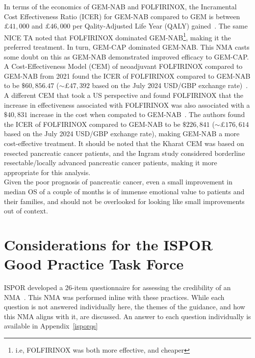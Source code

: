 In terms of the economics of GEM-NAB and FOLFIRINOX, the Incramental Cost Effectiveness Ratio (ICER) for GEM-NAB compared to GEM is between $£41,000$ and $£46,000$ per Qality-Adjusted Life Year (QALY) gained~\cite{TA476}. The same NICE TA noted that FOLFIRINOX dominated GEM-NAB\footnote{i.e, FOLFIRINOX was both more effective, and cheaper}, making it the preferred treatment. In turn, GEM-CAP dominated GEM-NAB. This NMA casts some doubt on this as GEM-NAB demonstrated improved efficacy to GEM-CAP. A Cost-Effectiveness Model (CEM) of neoadjuvant FOLFIRINOX compared to GEM-NAB from 2021 found the ICER of FOLFIRINOX compared to GEM-NAB to be $\$60,856.47$ ($\sim £47,392$ based on the July 2024 USD/GBP exchange rate)~\cite{ingram}. A different CEM that took a US perspective and found FOLFIRINOX that the increase in effectiveness associated with FOLFIRINOX was also associated with a $\$40,831$ increase in the cost when compated to GEM-NAB~\cite{kharat}. The authors found the ICER of FOLFIRINOX compared to GEM-NAB to be $\$226,841$ ($\sim £176,614$ based on the July 2024 USD/GBP exchange rate), making GEM-NAB a more cost-effective treatment. It should be noted that the Kharat CEM was based on resected pancreatic cancer patients, and the Ingram study considered borderline resectable/locally advanced pancreatic cancer patients, making it more appropriate for this analysis. \\

Given the poor prognosis of pancreatic cancer, even a small improvement in median OS of a couple of months is of immense emotional value to patients and their families, and should not be overlooked for looking like small improvements out of context.

\section{Considerations for the ISPOR Good Practice Task Force}
ISPOR developed a 26-item questionnaire for assessing the credibility of an NMA~\cite{jansengp}. This NMA was performed inline with these practices. While each question is not answered individually here, the themes of the guidance, and how this NMA aligns with it, are discussed. An answer to each question individually is available in Appendix~\ref{isporqs}\\


